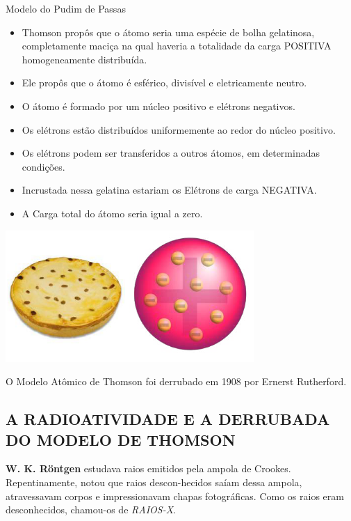 \documentclass[10pt]{scrartcl}
\begin{document}
\begin{Box2}{Modelo do Pudim de Passas}
\begin{itemize}
\item Thomson propôs que o átomo seria uma espécie de bolha  gelatinosa,  completamente  maciça  na  qual  haveria a totalidade da carga POSITIVA homogeneamente distribuída.
\item Ele propôs que o átomo é esférico, divisível e eletricamente neutro.
\item O átomo é formado por um núcleo positivo e elétrons negativos.
\item Os elétrons estão distribuídos uniformemente ao redor do núcleo positivo.
\item Os elétrons podem ser transferidos a outros átomos, em determinadas condições.
\item Incrustada nessa gelatina estariam os Elétrons de carga NEGATIVA.
\item A Carga total do átomo seria igual a zero.
\end{itemize}
\begin{center}
\includegraphics[width=.9\linewidth]{Quimica-Geral-Aula/pudim.png}
\end{center}

O Modelo Atômico de Thomson foi derrubado em 1908 por Ernerst Rutherford.

\end{Box2}


\subsection{A  RADIOATIVIDADE  E  A  DERRUBADA  DO MODELO DE THOMSON}
\label{sec:org61636e6}

\textbf{W. K. Röntgen} estudava raios emitidos pela ampola de Crookes. Repentinamente, notou que raios descon-hecidos saíam dessa ampola, atravessavam corpos e impressionavam chapas fotográficas. Como os raios eram desconhecidos, chamou-os de \emph{RAIOS-X}.
\end{document}
